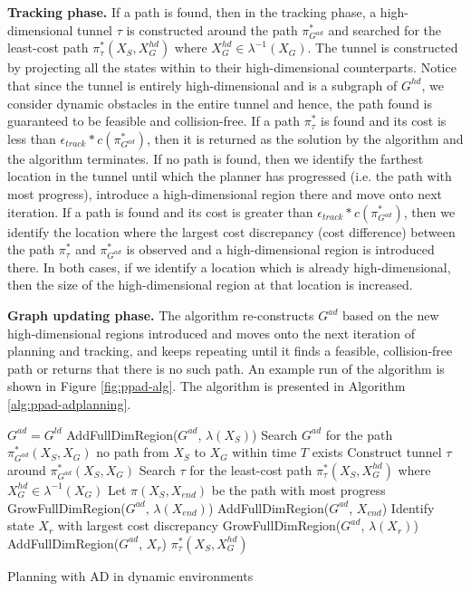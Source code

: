 {\bf Tracking phase.} If a path is found, then in the tracking phase, a high-dimensional tunnel $\tau$ is constructed around the path $\pi_{G^{ad}}^*$ and searched for the least-cost path $\pi_\tau^*(X_S, X_G^{hd})$ where $X_G^{hd} \in \lambda^{-1}(X_G)$. The tunnel is constructed by projecting all the states within to their high-dimensional counterparts. Notice that since the tunnel is entirely high-dimensional and is a subgraph of $G^{hd}$, we consider dynamic obstacles in the entire tunnel and hence, the path found is guaranteed to be feasible and collision-free. If a path $\pi_\tau^*$ is found and its cost is less than $\epsilon_{track}*c(\pi_{G^{ad}}^*)$, then it is returned as the solution by the algorithm and the algorithm terminates. If no path is found, then we identify the farthest location in the tunnel until which the planner has progressed (i.e. the path with most progress), introduce a high-dimensional region there and move onto next iteration. If a path is found and its cost is greater than $\epsilon_{track}*c(\pi_{G^{ad}}^*)$, then we identify the location where the largest cost discrepancy (cost difference) between the path $\pi_\tau^*$ and $\pi_{G^{ad}}^*$ is observed and a high-dimensional region is introduced there. In both cases, if we identify a location which is already high-dimensional, then the size of the high-dimensional region at that location is increased.

{\bf Graph updating phase.} The algorithm re-constructs $G^{ad}$ based on the new high-dimensional regions introduced and moves onto the next iteration of planning and tracking, and keeps repeating until it finds a feasible, collision-free path or returns that there is no such path. An example run of the algorithm is shown in Figure \ref{fig:ppad-alg}. The algorithm is presented in Algorithm \ref{alg:ppad-adplanning}.


\begin{algorithm}[h]
\begin{algorithmic}[1]
\State $G^{ad} = G^{ld}$
\State AddFullDimRegion($G^{ad}$, $\lambda(X_S)$)
\Loop
\State Search $G^{ad}$ for the path $\pi_{G^{ad}}^*(X_S, X_G)$
\State \Return no path from $X_S$ to $X_G$ within time $T$ exists
\EndIf
\State Construct tunnel $\tau$ around $\pi_{G^{ad}}^*(X_S, X_G)$
\State Search $\tau$ for the least-cost path $\pi_{\tau}^*(X_S, X_G^{hd})$ where $X_G^{hd} \in \lambda^{-1}(X_G)$
\State Let $\pi(X_S, X_{end})$ be the path with most progress
\State GrowFullDimRegion($G^{ad}$, $\lambda(X_{end})$)
\Else
\State AddFullDimRegion($G^{ad}$, $X_{end}$)
\EndIf
{}
\State Identify state $X_r$ with largest cost discrepancy
\State GrowFullDimRegion($G^{ad}$, $\lambda(X_r)$)
\Else
\State AddFullDimRegion($G^{ad}$, $X_r$)
\EndIf
\Else
\State \Return $\pi_{\tau}^*(X_S, X_G^{hd})$
\EndIf
\EndLoop
\end{algorithmic}
\caption{Planning with AD in dynamic environments}
\label{alg:ppad-adplanning}
\end{algorithm}

